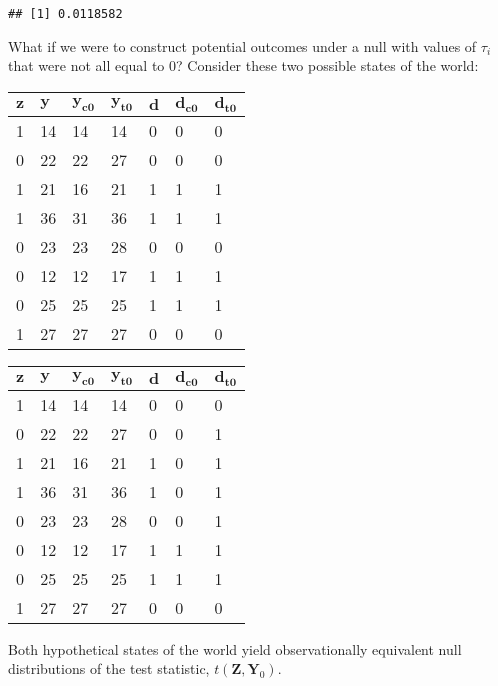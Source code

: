 \documentclass[12pt,leqno]{article}
\theoremstyle{newstyle}
\begin{document}
\begin{verbatim}
## [1] 0.0118582
\end{verbatim}

What if we were to construct potential outcomes under a null with values
of \(\tau_i\) that were not all equal to 0? Consider these two possible
states of the world:

\begin{table}[H]
\centering
    \begin{tabular}{l|l|l|l|l|l|l}
    $\mathbf{z}$ & $\mathbf{y}$ & $\mathbf{y_{c0}}$ & $\mathbf{y_{t0}}$ & $\mathbf{d}$ & $\mathbf{d_{c0}}$ & $\mathbf{d_{t0}}$ \\ \hline
    1 & 14 & 14 & 14 & 0 & 0 & 0 \\
    0 & 22 & 22 & 27 & 0 & 0 & 0 \\
    1 & 21 & 16 & 21 & 1 & 1 & 1 \\
    1 & 36 & 31 & 36 & 1 & 1 & 1 \\
    0 & 23 & 23 & 28 & 0 & 0 & 0 \\
    0 & 12 & 12 & 17 & 1 & 1 & 1 \\
    0 & 25 & 25 & 25 & 1 & 1 & 1 \\
    1 & 27 & 27  & 27 & 0 & 0 & 0\\
    \end{tabular}
    \hfill 
    \begin{tabular}{l|l|l|l|l|l|l}
    $\mathbf{z}$ & $\mathbf{y}$ & $\mathbf{y_{c0}}$ & $\mathbf{y_{t0}}$ & $\mathbf{d}$ & $\mathbf{d_{c0}}$ & $\mathbf{d_{t0}}$ \\ \hline
    1 & 14 & 14 & 14 & 0 & 0 & 0 \\
    0 & 22 & 22 & 27 & 0 & 0 & 1 \\
    1 & 21 & 16 & 21 & 1 & 0 & 1 \\
    1 & 36 & 31 & 36 & 1 & 0 & 1 \\
    0 & 23 & 23 & 28 & 0 & 0 & 1 \\
    0 & 12 & 12 & 17 & 1 & 1 & 1 \\
    0 & 25 & 25 & 25 & 1 & 1 & 1 \\
    1 & 27 & 27  & 27 & 0 & 0 & 0\\
    \end{tabular}
\end{table}

Both hypothetical states of the world yield observationally equivalent
null distributions of the test statistic,
\(t\left(\mathbf{Z}, \mathbf{Y}_0\right)\).
\end{document}
